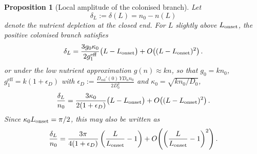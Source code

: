 \documentclass[11pt,a4paper]{report}
\newtheorem{proposition}{Proposition}
\begin{document}
	\begin{proposition}[Local amplitude of the colonised branch]
		\label{prop:local_amplitude_branch}
		Let
		\[
		\delta_L:=\delta(L)=n_0-n(L)
		\]
		denote the nutrient depletion at the closed end.  For $L$ slightly above
		$L_{\rm onset}$, the positive colonised branch satisfies
		\begin{equation}
			{
				\delta_L
				=
				\frac{3g_0\kappa_0}{2g_1^{\mathrm{eff}}}
				\bigl(L-L_{\rm onset}\bigr)
				+
				O\!\left((L-L_{\rm onset})^2\right).
			}
			\label{eq:deltaL_linear_general}
		\end{equation}
		or under the low nutrient approximation $g(n)\approx kn$,
		so that $g_0=kn_0$, $g_1^{\mathrm{eff}}=k(1+\epsilon_D)$ with $\epsilon_D:=\frac{D_{\mathrm{col}}'(0)\,YD_nn_0}{2D_0^2}$ and
		$\kappa_0=\sqrt{kn_0/D_0}$,
		\begin{equation}
			{
				\frac{\delta_L}{n_0}
				=
				\frac{3\kappa_0}{2(1+\epsilon_D)}
				\bigl(L-L_{\rm onset}\bigr)
				+
				O\!\left((L-L_{\rm onset})^2\right).
			}
			\label{eq:deltaL_linear_low_nutrient}
		\end{equation}
		Since $\kappa_0L_{\rm onset}=\pi/2$, this may also be written as
		\begin{equation}
			{
				\frac{\delta_L}{n_0}
				=
				\frac{3\pi}{4(1+\epsilon_D)}
				\left(
				\frac{L}{L_{\rm onset}}-1
				\right)
				+
				O\!\left(
				\left(
				\frac{L}{L_{\rm onset}}-1
				\right)^2
				\right).
			}
			\label{eq:deltaL_linear_dimensionless}
		\end{equation}
	\end{proposition}
	
\end{document}
